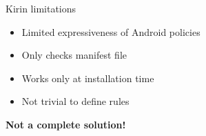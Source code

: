 \begin{frame}{Kirin limitations}

\vspace*{-1cm}
\fontsize{15pt}{0}\selectfont
\begin{itemize}
  \item Limited expressiveness of Android policies

  \item Only checks manifest file

  \item Works only at installation time

  \item Not trivial to define rules
\end{itemize}

\vfill

\fontsize{18pt}{0}\selectfont
{}
\hspace*{3cm}
\textbf{Not a complete solution!}

\end{frame}